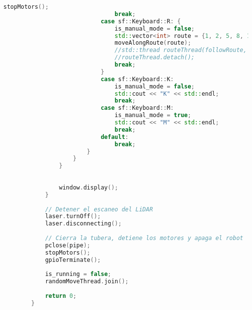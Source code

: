 \begin{lstlisting}[language={C++}, caption={Quinto ajuste de c\'odigo}, label={QuintoAjuste}]
                                stopMotors();
                                break;
                            case sf::Keyboard::R: {
                                is_manual_mode = false;
                                std::vector<int> route = {1, 2, 5, 8, 11, 14, 13, 16};
                                moveAlongRoute(route);
                                //std::thread routeThread(followRoute, std::ref(window), std::ref(routePoints), std::ref(scan), minimap.getPosition(), max_range);
                                //routeThread.detach();
                                break;
                            }
                            case sf::Keyboard::K:
                                is_manual_mode = false;
                                std::cout << "K" << std::endl;
                                break;
                            case sf::Keyboard::M:
                                is_manual_mode = true;
                                std::cout << "M" << std::endl;
                                break;
                            default:
                                break;
                        }
                    }
                }
        
        
                window.display();
            }
        
            // Detener el escaneo del LiDAR
            laser.turnOff();
            laser.disconnecting();
        
            // Cierra la tubera, detiene los motores y apaga el robot
            pclose(pipe);
            stopMotors();
            gpioTerminate();
        
            is_running = false;
            randomMoveThread.join();
        
            return 0;
        }
    \end{lstlisting}